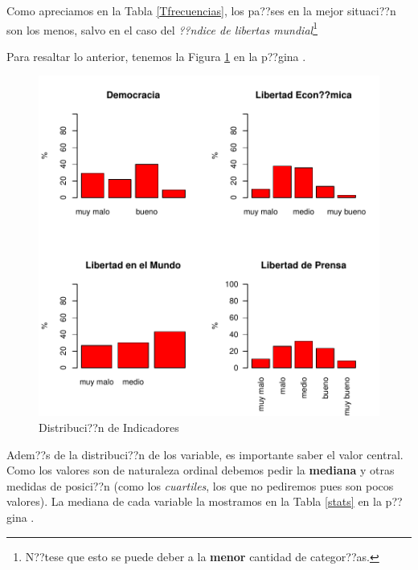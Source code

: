 \documentclass{article}
\begin{document}
Como apreciamos en la Tabla \ref{Tfrecuencias}, los pa??ses en la mejor situaci??n son los menos, salvo en el caso del \emph{??ndice de libertas mundial}\footnote{N??tese que esto se puede deber a la {\bf menor} cantidad de categor??as.}

\clearpage

Para resaltar lo anterior, tenemos la Figura \ref{barplots} en la p??gina \pageref{barplots}. 


\begin{figure}[h]
\centering
\includegraphics{paperVersion_6-barplots}
\caption{Distribuci??n de Indicadores}
\label{barplots}
\end{figure}

Adem??s de la distribuci??n de los variable, es importante saber el valor central. Como los valores son de naturaleza ordinal debemos pedir la {\bf mediana} y otras medidas de posici??n (como los \emph{cuartiles}, los que no pediremos pues son pocos valores). La mediana de cada variable la mostramos en la Tabla \ref{stats} en la p??gina \pageref{stats}.
\end{document}

